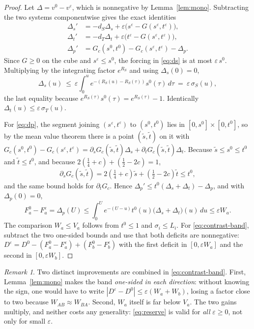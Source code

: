 \documentclass[11pt]{article}
\theoremstyle{plain}
\theoremstyle{definition}
\theoremstyle{remark}
\newtheorem{remark}[theorem]{Remark}
\newcommand{\eps}{\varepsilon}
\begin{document}
\begin{proof}
Let $\Delta=v^0-v^{\eps}$, which is nonnegative by Lemma~\ref{lem:mono}.
Subtracting the two systems componentwise gives the exact identities
\begin{align}
 \Delta_s'&=-d_S\Delta_s+\eps\bigl(s^{\eps}-G(s^{\eps},t^{\eps})\bigr),
 \label{eq:ds}\\
 \Delta_t'&=-d_T\Delta_t+\eps\bigl(t^{\eps}-G(s^{\eps},t^{\eps})\bigr),
 \nonumber\\
 \Delta_p'&=G_c(s^0,t^0)-G_c(s^{\eps},t^{\eps})-\Delta_p .
 \label{eq:dp}
\end{align}
Since $G\ge0$ on the cube and $s^{\eps}\le s^0$, the forcing in \eqref{eq:ds}
is at most $\eps\,s^0$. Multiplying by the integrating factor $e^{R_S}$ and
using $\Delta_s(0)=0$,
\[
 \Delta_s(u)\ \le\ \eps\int_0^u e^{-(R_S(u)-R_S(\tau))}s^0(\tau)\,d\tau
 \ =\ \eps\,\sigma_S(u),
\]
the last equality because $e^{R_S(\tau)}s^0(\tau)=e^{R_S(\tau)}-1$. Identically
$\Delta_t(u)\le\eps\,\sigma_T(u)$.

For \eqref{eq:dp}, the segment joining $(s^{\eps},t^{\eps})$ to $(s^0,t^0)$
lies in $[0,s^0]\times[0,t^0]$, so by the mean value theorem there is a point
$(\tilde s,\tilde t)$ on it with
$G_c(s^0,t^0)-G_c(s^{\eps},t^{\eps})
 =\partial_sG_c(\tilde s,\tilde t)\Delta_s+\partial_tG_c(\tilde s,\tilde t)\Delta_t$.
Because $\tilde s\le s^0\le t^0$ and $\tilde t\le t^0$, and because
$2(\tfrac14+c)+(\tfrac12-2c)=1$,
\[
 \partial_sG_c(\tilde s,\tilde t)=2(\tfrac14+c)\tilde s+(\tfrac12-2c)\tilde t\le t^0 ,
\]
and the same bound holds for $\partial_tG_c$. Hence
$\Delta_p'\le t^0(\Delta_s+\Delta_t)-\Delta_p$, and with $\Delta_p(0)=0$,
\[
 F^0_a-F^{\eps}_a=\Delta_p(U)\le\int_0^{U}e^{-(U-u)}t^0(u)\bigl(\Delta_s+\Delta_t\bigr)(u)\,du
 \le\eps W_a .
\]
The comparison $W_a\le V_a$ follows from $t^0\le1$ and $\sigma_i\le L_i$. For
\eqref{eq:contrast-band}, subtract the two one-sided bounds and use that both
deficits are nonnegative: $D^{\eps}=D^0-(F^0_a-F^{\eps}_a)+(F^0_b-F^{\eps}_b)$
with the first deficit in $[0,\eps W_a]$ and the second in $[0,\eps W_b]$.
\end{proof}

\begin{remark}\label{rem:twoimprovements}
Two distinct improvements are combined in \eqref{eq:contrast-band}. First,
Lemma~\ref{lem:mono} makes the band \emph{one-sided in each direction}: without
knowing the sign, one would have to write $|D^\eps-D^0|\le\eps(W_a+W_b)$,
losing a factor close to two because $W_{AB}\approx W_{BA}$. Second,
$W_a$ itself is far below $V_a$. The two gains multiply, and neither costs any
generality: \eqref{eq:reserve} is valid for \emph{all} $\eps\ge0$, not only for
small $\eps$.
\end{remark}
\end{document}
